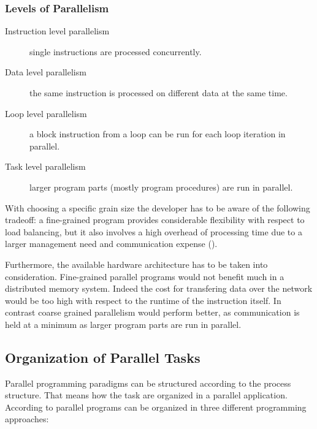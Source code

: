 \subsubsection{Levels of Parallelism}
\begin{description}
\item[Instruction level parallelism] single instructions are processed
  concurrently.
\item[Data level parallelism] the same instruction is processed on
  different data at the same time.
\item[Loop level parallelism] a block instruction from a loop can be
  run for each loop iteration in parallel.
\item[Task level parallelism] larger program parts (mostly
  program procedures) are run in parallel.
\end{description}

With choosing a specific grain size the developer has to be aware of
the following tradeoff: a fine-grained program provides considerable
flexibility with respect to load 
balancing, but it also involves 
a high overhead of processing time due to a larger management need and
communication expense (\cite{sevcikova04simulations}).

Furthermore, the available hardware architecture has to be taken
into consideration. Fine-grained parallel programs would not benefit
much in a distributed memory system. Indeed the cost for transfering
data over the network would be too high with respect to the runtime of
the instruction itself. In contrast coarse grained parallelism would
perform better, as communication is held at a minimum as larger
program parts are run in parallel.

\subsection{Organization of Parallel Tasks}

Parallel programming paradigms can be structured according to the
process structure. That means how the task are organized in a parallel
application. According to \cite{geist94pvm} parallel programs can be
organized in three different programming approaches:


